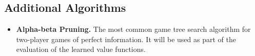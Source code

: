 \documentclass{article}
\begin{document}
\subsection{Additional Algorithms}

\begin{itemize}

    \item \textbf{Alpha-beta Pruning.} The most common game tree search algorithm for two-player
        games of perfect information. It will be used as part of the evaluation of the learned value
        functions.

\end{itemize}




\end{document}
